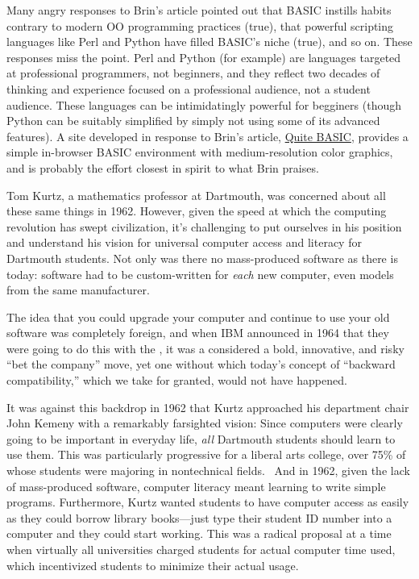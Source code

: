 \begin{geeknote}
Many angry responses to Brin's article pointed out that BASIC
instills habits contrary to modern OO programming practices (true),
that powerful scripting languages like Perl and Python have filled BASIC's
niche (true), and so on.  These responses miss the point.  
Perl and Python (for example) are languages
targeted at professional programmers, not beginners, and they
reflect two decades of thinking and experience focused on a professional audience,
not a student audience.  These languages can be intimidatingly powerful
for begginers (though Python can be suitably simplified by simply
not using some of its advanced features).
A site developed in response to Brin's article, 
\href{http://quitebasic.com}{Quite BASIC}, provides a simple in-browser
BASIC environment with medium-resolution color graphics, and is probably
the effort closest in spirit to what Brin praises.

\end{geeknote}

Tom Kurtz, a mathematics professor at Dartmouth, was concerned about all
these same things in 1962.
However, given the speed at which the computing revolution has swept
civilization, it's challenging to put ourselves in his position and
understand his vision for universal computer access and literacy for
Dartmouth students.
Not only was there no mass-produced software as
there is today: software  had to be custom-written for \emph{each} new
computer, even models from the same manufacturer.  

  \begin{geeknote}
  The idea that
  you could upgrade your computer and continue to use your old software
  was completely foreign, and when IBM announced in 1964 that
  they were going to do this with the , it was a considered a bold,
  innovative, and risky ``bet the
  company'' move, yet one without which today's concept of ``backward
  compatibility,'' which we take for granted, would not have happened.
  \end{geeknote}

It was against this backdrop 
in 1962 that Kurtz approached
his department chair John Kemeny with a remarkably farsighted vision:
Since computers were clearly going to be important in everyday
life, \emph{all} Dartmouth students should learn to use them.  This was
particularly progressive for a liberal arts college,
over 75\% of whose students were majoring in nontechnical fields.~\cite{goto}
And in 1962, given the lack of mass-produced software,
computer literacy meant learning to
write simple programs.
Furthermore, Kurtz wanted students to have computer access as easily as
they could borrow library books---just type their student ID number into
a computer and they could start working.  This was a radical proposal at
a time when virtually all universities charged students for actual
computer time used, which incentivized students to minimize their actual
usage. 


